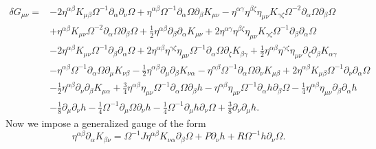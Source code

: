\documentclass[10pt,letterpaper]{article}
\begin{document}
\begin{align}
\delta G_{\mu\nu}={}&-2 \eta^{\alpha \beta} K_{\mu \beta} \Omega^{-1} \partial_{\alpha}\partial_{\nu}\Omega
 + \eta^{\alpha \beta} \Omega^{-1} \partial_{\alpha}\Omega \partial_{\beta}K_{\mu \nu}
 -  \eta^{\alpha \gamma} \eta^{\beta \zeta} \eta_{\mu \nu} K_{\gamma \zeta} \Omega^{-2} \partial_{\alpha}\Omega \partial_{\beta}\Omega\nonumber\\
& + \eta^{\alpha \beta} K_{\mu \nu} \Omega^{-2} \partial_{\alpha}\Omega \partial_{\beta}\Omega
 + \tfrac{1}{2} \eta^{\alpha \beta} \partial_{\beta}\partial_{\alpha}K_{\mu \nu}
 + 2 \eta^{\alpha \gamma} \eta^{\beta \zeta} \eta_{\mu \nu} K_{\gamma \zeta} \Omega^{-1} \partial_{\beta}\partial_{\alpha}\Omega\nonumber\\
& - 2 \eta^{\alpha \beta} K_{\mu \nu} \Omega^{-1} \partial_{\beta}\partial_{\alpha}\Omega
 + 2 \eta^{\alpha \beta} \eta^{\gamma \zeta} \eta_{\mu \nu} \Omega^{-1} \partial_{\alpha}\Omega \partial_{\zeta}K_{\beta \gamma}
 + \tfrac{1}{2} \eta^{\alpha \beta} \eta^{\gamma \zeta} \eta_{\mu \nu} \partial_{\zeta}\partial_{\beta}K_{\alpha \gamma}\nonumber\\
& -  \eta^{\alpha \beta} \Omega^{-1} \partial_{\alpha}\Omega \partial_{\mu}K_{\nu \beta}
 -  \tfrac{1}{2} \eta^{\alpha \beta} \partial_{\mu}\partial_{\beta}K_{\nu \alpha}
 -  \eta^{\alpha \beta} \Omega^{-1} \partial_{\alpha}\Omega \partial_{\nu}K_{\mu \beta}
 + 2 \eta^{\alpha \beta} K_{\mu \beta} \Omega^{-1} \partial_{\nu}\partial_{\alpha}\Omega\nonumber\\
& -  \tfrac{1}{2} \eta^{\alpha \beta} \partial_{\nu}\partial_{\beta}K_{\mu \alpha}
+\tfrac{3}{4} \eta^{\alpha \beta} \eta_{\mu \nu} \Omega^{-1} \partial_{\alpha}\Omega \partial_{\beta}h
 -  \eta^{\alpha \beta} \eta_{\mu \nu} \Omega^{-1} \partial_{\alpha}h \partial_{\beta}\Omega
 -  \tfrac{1}{4} \eta^{\alpha \beta} \eta_{\mu \nu} \partial_{\beta}\partial_{\alpha}h\nonumber\\
 &-  \tfrac{1}{8} \partial_{\mu}\partial_{\nu}h
-  \tfrac{1}{4} \Omega^{-1} \partial_{\mu}\Omega \partial_{\nu}h
 -  \tfrac{1}{4} \Omega^{-1} \partial_{\mu}h \partial_{\nu}\Omega
 + \tfrac{3}{8} \partial_{\nu}\partial_{\mu}h.
\end{align}
Now we impose a generalized gauge of the form
\begin{equation}
	\eta^{\alpha\beta}\partial_{\alpha}K_{\beta\nu} = \Omega^{-1} J \eta^{\alpha\beta}K_{\nu\alpha}\partial_\beta \Omega + P \partial_\nu h + R \Omega^{-1} h \partial_\nu \Omega.
\end{equation}
\end{document}
